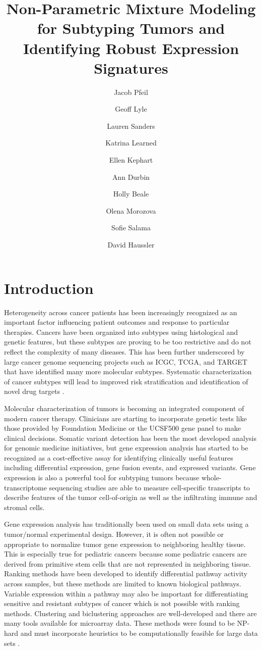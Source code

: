 \documentclass[fleqn,10pt]{wlscirep}
\title{Non-Parametric Mixture Modeling for Subtyping Tumors and Identifying Robust Expression Signatures}
\author[1,*]{Jacob Pfeil}
\author[1]{Geoff Lyle}
\author[1]{Lauren Sanders}
\author[1]{Katrina Learned}
\author[1]{Ellen Kephart}
\author[1]{Ann Durbin}
\author[1]{Holly Beale}
\author[1]{Olena Morozova}
\author[1]{Sofie Salama}
\author[1]{David Haussler}
\affil[1]{University of California, Santa Cruz, Biomolecular Engineering, Santa Cruz, 95064, United States}
\affil[*]{jpfeil@ucsc.edu}
\begin{document}
\flushbottom
\maketitle
%
%
\thispagestyle{empty}


\section*{Introduction}

Heterogeneity across cancer patients has been increasingly recognized as an important factor influencing patient outcomes and response to particular therapies. Cancers have been organized into subtypes using histological and genetic features, but these subtypes are proving to be too restrictive and do not reflect the complexity of many diseases. This has been further underscored by large cancer genome sequencing projects such as ICGC, TCGA, and TARGET that have identified many more molecular subtypes. Systematic characterization of cancer subtypes will lead to improved risk stratification and identification of novel drug targets \cite{zhao2018molecular}.

Molecular characterization of tumors is becoming an integrated component of modern cancer therapy. Clinicians are starting to incorporate genetic tests like those provided by Foundation Medicine or the UCSF500 gene panel to make clinical decisions. Somatic variant detection has been the most developed analysis for genomic medicine initiatives, but gene expression analysis has started to be recognized as a cost-effective assay for identifying clinically useful features including differential expression, gene fusion events, and expressed variants. Gene expression is also a powerful tool for subtyping tumors because whole-transcriptome sequencing studies are able to measure cell-specific transcripts to describe features of the tumor cell-of-origin as well as the infiltrating immune and stromal cells.

Gene expression analysis has traditionally been used on small data sets using  a tumor/normal experimental design. However, it is often not possible or appropriate to normalize tumor gene expression to neighboring healthy tissue. This is especially true for pediatric cancers because some pediatric cancers are derived from primitive stem cells that are not represented in neighboring tissue. Ranking methods have been developed to identify differential pathway activity across samples, but these methods are limited to known biological pathways. Variable expression within a pathway may also be important for differentiating sensitive and resistant subtypes of cancer which is not possible with ranking methods. Clustering and biclustering approaches are well-developed and there are many tools available for microarray data. These methods were found to be NP-hard and must incorporate heuristics to be computationally feasible for large data sets \cite{zhao2018molecular,eren2012comparative}. 
\end{document}
